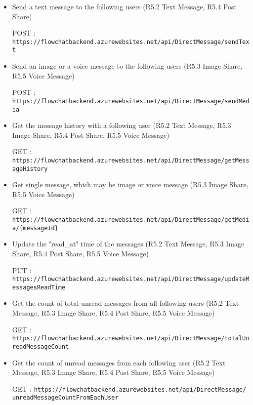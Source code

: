 \documentclass[11pt, a4paper]{article}
\begin{document}
\begin{itemize}
    \item Send a text message to the following users (R5.2 Text Message, R5.4 Post Share)
    
    POST :  \texttt{https://flowchatbackend.azurewebsites.net/api/DirectMessage/sendText}

    \item Send an image or a voice message to the following users (R5.3 Image Share, R5.5 Voice Message)
    
    POST : \texttt{https://flowchatbackend.azurewebsites.net/api/DirectMessage/sendMedia}

    \item Get the message history with a following user (R5.2 Text Message, R5.3 Image Share, R5.4 Post Share, R5.5 Voice Message)
    
    GET : \texttt{https://flowchatbackend.azurewebsites.net/api/DirectMessage/getMessageHistory}

    \item Get single message, which may be image or voice message (R5.3 Image Share, R5.5 Voice Message)
    
    GET :  \texttt{https://flowchatbackend.azurewebsites.net/api/DirectMessage/getMedia/\{messageId\}}

    \item Update the "read\_at" time of the messages (R5.2 Text Message, R5.3 Image Share, R5.4 Post Share, R5.5 Voice Message)
    
    PUT : \texttt{https://flowchatbackend.azurewebsites.net/api/DirectMessage/updateMessagesReadTime}

    \item Get the count of total unread messages from all following users (R5.2 Text Message, R5.3 Image Share, R5.4 Post Share, R5.5 Voice Message)
    
    GET : \texttt{https://flowchatbackend.azurewebsites.net/api/DirectMessage/totalUnreadMessageCount}

    \item  Get the count of unread messages from each following user (R5.2 Text Message, R5.3 Image Share, R5.4 Post Share, R5.5 Voice Message)
    
    GET : \texttt{https://flowchatbackend.azurewebsites.net/api/DirectMessage/\\
    unreadMessageCountFromEachUser}
\end{itemize}
\end{document}
